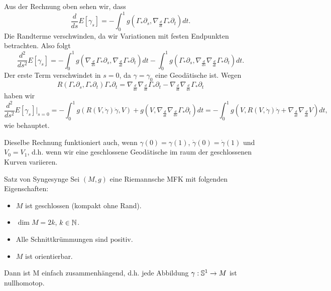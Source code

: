 \begin{beweis}
Aus der Rechnung oben sehen wir, dass
\begin{equation}
\frac{d}{ds} E[\gamma_s] = - \int_0^1 g(\Gamma_\ast \partial_s, \nabla_\frac{d}{dt} \Gamma_\ast \partial_t) dt.
\end{equation}
Die Randterme verschwinden, da wir Variationen mit festen Endpunkten betrachten. Also folgt
\begin{equation}
\frac{d^2}{ds^2} E[\gamma_s]=-\int_0^1 g(\nabla_\frac{d}{ds} \Gamma_\ast \partial_s, \nabla_\frac{d}{dt} \Gamma_\ast \partial_t) dt - \int_0^1 g(\Gamma_\ast \partial_s, \nabla_\frac{d}{ds} \nabla_\frac{d}{dt} \Gamma_\ast \partial_t)dt.
\end{equation}
Der erste Term verschwindet in $s=0$, da $\gamma=\gamma_0$ eine Geodätische ist. Wegen
\begin{equation}
R(\Gamma_\ast \partial_s, \Gamma_\ast \partial_t)\Gamma_\ast \partial_t=\nabla_\frac{d}{ds} \nabla_\frac{d}{dt} \Gamma_\ast \partial_t - \nabla_\frac{d}{dt} \nabla_\frac{d}{ds} \Gamma_\ast \partial_t
\end{equation}
haben wir
\begin{equation}
\frac{d^2}{ds^2}E[\gamma_s]|_{s=0} = - \int_0^1 g(R(V, \dot{\gamma})\dot{\gamma}, V) + g(V, \nabla_\frac{d}{dt} \nabla_\frac{d}{ds} \Gamma_\ast \partial_t) dt = - \int_0^1 g(V, R(V, \dot{\gamma})\dot{\gamma} + \nabla_\frac{d}{dt} \nabla_\frac{d}{dt} V) dt,
\end{equation}
wie behauptet.
\end{beweis}
\begin{bemerkung}
Dieselbe Rechnung funktioniert auch, wenn $\gamma(0)=\gamma(1)$, $\dot{\gamma}(0) = \dot{\gamma}(1)$ und $V_0=V_1$, d.h. wenn wir eine geschlossene Geodätische im raum der geschlossenen Kurven variieren.
\end{bemerkung}
\begin{satz}{Satz von Synge}{synge}
Sei $(M,g)$ eine Riemannsche MFK mit folgenden Eigenschaften:
\begin{itemize}
\item $M$ ist geschlossen (kompakt ohne Rand).
\item $\dim M = 2k$, $k\in \mathbb{N}$.
\item Alle Schnittkrümmungen sind positiv.
\item $M$ ist orientierbar.
\end{itemize}
Dann ist M einfach zusammenhängend, d.h. jede Abbildung $\gamma: \mathbb{S}^1 \to M$ ist nullhomotop.
\end{satz}
